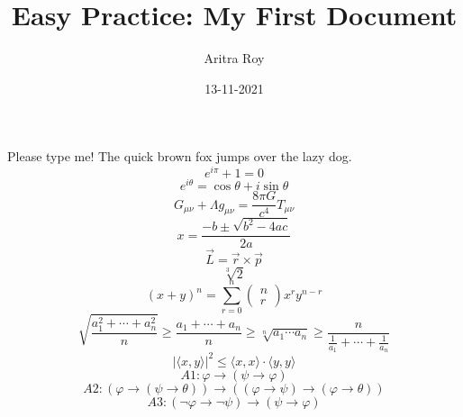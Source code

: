 \documentclass{article}
\title{Easy Practice: My First Document}
\date{13-11-2021}
\author{Aritra Roy}
\begin{document}
\maketitle
\begin{center}
Please type me! The quick brown fox jumps over the lazy dog.
\[e^{i\pi}+1=0\]
\[e^{i\theta}=\cos\theta+i\sin\theta\]
\[G_{\mu\nu}+\Lambda g_{\mu\nu}=\frac{8\pi G}{c^4}T_{\mu\nu}\]
\[x=\frac{-b\pm \sqrt{b^2-4ac}}{2a}\]
\[\vec{L}=\vec{r}\times\vec{p}\]
\[\sqrt[3]{2}\]
\[(x+y)^n=\sum_{r=0}^n\left(\begin{array}{ccc}n\\r\end{array}\right)x^ry^{n-r}\]
\[\sqrt{\frac{a_1^2+\cdots+a_n^2}{n}}\ge\frac{a_1+\cdots+a_n}{n}\ge\sqrt[n]{a_1\cdots a_n}\ge\frac{n}{\frac{1}{a_1}+\cdots+\frac{1}{a_n}}\]
\[|\langle x,y\rangle|^2\le\langle x,x\rangle\cdot\langle y,y\rangle\]
\[A1:\varphi \longrightarrow(\psi\rightarrow\varphi)\]
\[A2:(\varphi\rightarrow(\psi\rightarrow\theta))\longrightarrow((\varphi\rightarrow\psi)\rightarrow(\varphi\rightarrow\theta))\]
\[A3:(\neg\varphi\rightarrow\neg\psi)\longrightarrow(\psi\rightarrow\varphi)\]
\end{center}
\end{document}
